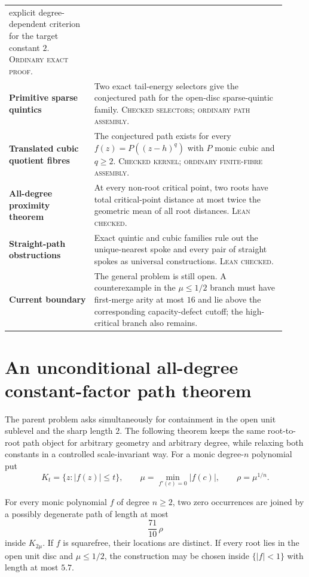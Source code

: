 \documentclass[11pt]{article}
\begin{document}
{\begin{tabular}{@{}
  >{\raggedright\arraybackslash}p{0.29\linewidth}
  >{\raggedright\arraybackslash}p{0.63\linewidth}@{}}
explicit degree-dependent criterion for the target constant $2$.
\textsc{Ordinary exact proof.} \\
\addlinespace
\textbf{Primitive sparse quintics} &
Two exact tail-energy selectors give the conjectured path for the open-disc
sparse-quintic family.  \textsc{Checked selectors; ordinary path assembly.} \\
\addlinespace
\textbf{Translated cubic quotient fibres} &
The conjectured path exists for every $f(z)=P((z-h)^q)$ with $P$ monic cubic
and $q\ge2$.  \textsc{Checked kernel; ordinary finite-fibre assembly.} \\
\addlinespace
\textbf{All-degree proximity theorem} &
At every non-root critical point, two roots have total critical-point
distance at most twice the geometric mean of all root distances.
\textsc{Lean checked.} \\
\addlinespace
\textbf{Straight-path obstructions} &
Exact quintic and cubic families rule out the unique-nearest spoke and every
pair of straight spokes as universal constructions.  \textsc{Lean checked.} \\
\addlinespace
\textbf{Current boundary} &
The general problem is still open.  A counterexample in the
$\mu\le1/2$ branch must have first-merge arity at most $16$ and lie above the
corresponding capacity-defect cutoff; the high-critical branch also remains. \\
\bottomrule
\end{tabular}}

\section{An unconditional all-degree constant-factor path theorem}
\label{sec:constant-factor}

The parent problem asks simultaneously for containment in the open unit
sublevel and the sharp length $2$.  The following theorem keeps the same
root-to-root path object for arbitrary geometry and arbitrary degree, while
relaxing both constants in a controlled scale-invariant way.  For a monic
degree-$n$ polynomial put
\[
 K_t=\{z:|f(z)|\le t\},\qquad
 \mu=\min_{f'(c)=0}|f(c)|,\qquad \rho=\mu^{1/n}.
\]

\begin{theorem}
\label{res:constant-factor-path}
For every monic polynomial $f$ of degree $n\ge2$, two zero occurrences are
joined by a possibly degenerate path of length at most
\[
 \frac{71}{10}\,\rho
\]
inside $K_{2\mu}$.  If $f$ is squarefree, their locations are distinct.
If every root lies in the open unit disc and $\mu\le1/2$, the construction
may be chosen inside $\{|f|<1\}$ with length at most $5.7$.
\end{theorem}
\end{document}
